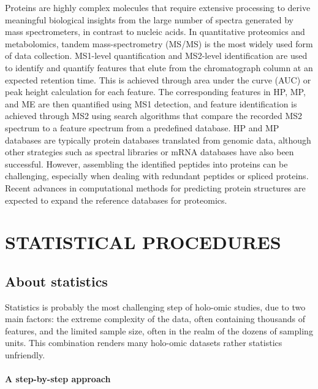 \documentclass[
]{book}
\begin{document}
Proteins are highly complex molecules that require extensive processing to derive meaningful biological insights from the large number of spectra generated by mass spectrometers, in contrast to nucleic acids. In quantitative proteomics and metabolomics, tandem mass-spectrometry (MS/MS) is the most widely used form of data collection. MS1-level quantification and MS2-level identification are used to identify and quantify features that elute from the chromatograph column at an expected retention time. This is achieved through area under the curve (AUC) or peak height calculation for each feature. The corresponding features in HP, MP, and ME are then quantified using MS1 detection, and feature identification is achieved through MS2 using search algorithms that compare the recorded MS2 spectrum to a feature spectrum from a predefined database. HP and MP databases are typically protein databases translated from genomic data, although other strategies such as spectral libraries or mRNA databases have also been successful. However, assembling the identified peptides into proteins can be challenging, especially when dealing with redundant peptides or spliced proteins. Recent advances in computational methods for predicting protein structures are expected to expand the reference databases for proteomics.

\hypertarget{part-statistical-procedures}{%
\part{STATISTICAL PROCEDURES}\label{part-statistical-procedures}}

\hypertarget{about-statistics}{%
\chapter{About statistics}\label{about-statistics}}

Statistics is probably the most challenging step of holo-omic studies, due to two main factors: the extreme complexity of the data, often containing thousands of features, and the limited sample size, often in the realm of the dozens of sampling units. This combination renders many holo-omic datasets rather statistics unfriendly.

\hypertarget{a-step-by-step-approach}{%
\subsection*{A step-by-step approach}\label{a-step-by-step-approach}}
\end{document}
